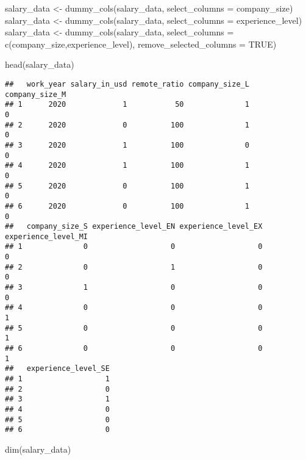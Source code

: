 \documentclass[
]{article}
\newenvironment{Shaded}{\begin{snugshade}}{\end{snugshade}}
\newcommand{\AttributeTok}[1]{\textcolor[rgb]{0.77,0.63,0.00}{#1}}
\newcommand{\ConstantTok}[1]{\textcolor[rgb]{0.00,0.00,0.00}{#1}}
\newcommand{\FunctionTok}[1]{\textcolor[rgb]{0.00,0.00,0.00}{#1}}
\newcommand{\NormalTok}[1]{#1}
\newcommand{\OtherTok}[1]{\textcolor[rgb]{0.56,0.35,0.01}{#1}}
\newcommand{\StringTok}[1]{\textcolor[rgb]{0.31,0.60,0.02}{#1}}
\begin{document}
\begin{Shaded}
\begin{Highlighting}[]
\NormalTok{salary\_data }\OtherTok{\textless{}{-}} \FunctionTok{dummy\_cols}\NormalTok{(salary\_data, }\AttributeTok{select\_columns =} \StringTok{\textquotesingle{}company\_size\textquotesingle{}}\NormalTok{)}
\NormalTok{salary\_data }\OtherTok{\textless{}{-}} \FunctionTok{dummy\_cols}\NormalTok{(salary\_data, }\AttributeTok{select\_columns =} \StringTok{\textquotesingle{}experience\_level\textquotesingle{}}\NormalTok{)}
\NormalTok{salary\_data }\OtherTok{\textless{}{-}} \FunctionTok{dummy\_cols}\NormalTok{(salary\_data, }\AttributeTok{select\_columns =} \FunctionTok{c}\NormalTok{(}\StringTok{\textquotesingle{}company\_size\textquotesingle{}}\NormalTok{,}\StringTok{\textquotesingle{}experience\_level\textquotesingle{}}\NormalTok{), }\AttributeTok{remove\_selected\_columns =} \ConstantTok{TRUE}\NormalTok{)}

\FunctionTok{head}\NormalTok{(salary\_data)}
\end{Highlighting}
\end{Shaded}

\begin{verbatim}
##   work_year salary_in_usd remote_ratio company_size_L company_size_M
## 1      2020             1           50              1              0
## 2      2020             0          100              1              0
## 3      2020             1          100              0              0
## 4      2020             1          100              1              0
## 5      2020             0          100              1              0
## 6      2020             0          100              1              0
##   company_size_S experience_level_EN experience_level_EX experience_level_MI
## 1              0                   0                   0                   0
## 2              0                   1                   0                   0
## 3              1                   0                   0                   0
## 4              0                   0                   0                   1
## 5              0                   0                   0                   1
## 6              0                   0                   0                   1
##   experience_level_SE
## 1                   1
## 2                   0
## 3                   1
## 4                   0
## 5                   0
## 6                   0
\end{verbatim}

\begin{Shaded}
\begin{Highlighting}[]
\FunctionTok{dim}\NormalTok{(salary\_data)}
\end{Highlighting}
\end{Shaded}
\end{document}

